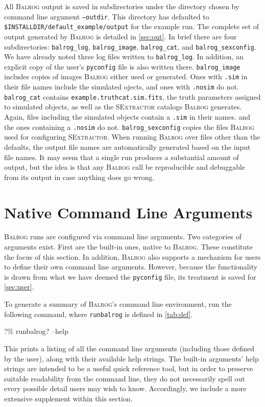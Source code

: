 \documentclass[11pt]{book}
\newcommand{\codett}[1]{\texttt{#1}}
\newcommand{\pyconfig}{\codett{pyconfig}}
\newcommand{\balrog}{\textsc{Balrog}}
\newcommand{\sex}{\textsc{SExtractor}}
\newcommand{\opt}[1]{\codett{--#1}}
\newcommand{\bcmd}{\% runbalrog}
\begin{document}
All \balrog{} output is saved in subdirectories under the directory chosen by command line argument \opt{outdir}.
This directory has defaulted to \codett{\$INSTALLDIR/default\_example/output} for the example run.
The complete set of output generated by \balrog{} is detailed in \autoref{sec:out}.
In brief there are four subdirectories:
\codett{balrog\_log}, \codett{balrog\_image}, \codett{balrog\_cat}, and \codett{balrog\_sexconfig}.
We have already noted three log files written to \codett{balrog\_log}. In addition, an explicit copy of 
the user's \pyconfig{} file is also written there.
\codett{balrog\_image} includes copies of images \balrog{} either used or generated.
Ones with \codett{.sim} in their file names include the simulated ojects, and ones with \codett{.nosim} do not.
\codett{balrog\_cat} contains \codett{example.truthcat.sim.fits}, the truth parameters assigned to simulated objects,
as well as the \sex{} catalogs \balrog{} generates.
Again, files including the simulated objects contain a \codett{.sim} in their names.
and the ones containing a \codett{.nosim} do not.
\codett{balrog\_sexconfig} copies the files \balrog{} used for configuring \sex{}.
When running \balrog{} over files other than the defaults, 
the output file names are automatically generated based on the input file names.
It may seem that a single run produces a substantial amount of output, but the idea
is that any \balrog{} call be reproducible and debuggable from its output in case anything does go wrong.


\chapter{Native Command Line Arguments}
\label{sec:cmdline}

\balrog{} runs are configured via command line arguments.
Two categories of arguments exist. 
First are the built-in ones, native to \balrog{}.
These constitute the focus of this section.
In addition, \balrog{} also supports a mechanism for users to define their own command line arguments.
However, because the functionality is drawn from what we have deemed the \pyconfig{} file,
its treatment is saved for \autoref{sec:user}.

To generate a summary of \balrog{}'s command line environment, run the following command,
where \codett{runbalrog} is defined in \autoref{tab:def}.
\begin{cmdline}
?\bcmd? --help
\end{cmdline}
This prints a listing of all the command line arguments (including those defined by the user), 
along with their available help strings.
The built-in arguments' help strings are intended to be a useful quick reference tool,
but in order to preserve suitable readability from the command line, 
they do not necessarily spell out every possible detail users may wish to know.
Accordingly, we include a more extensive supplement within this section.
\end{document}
